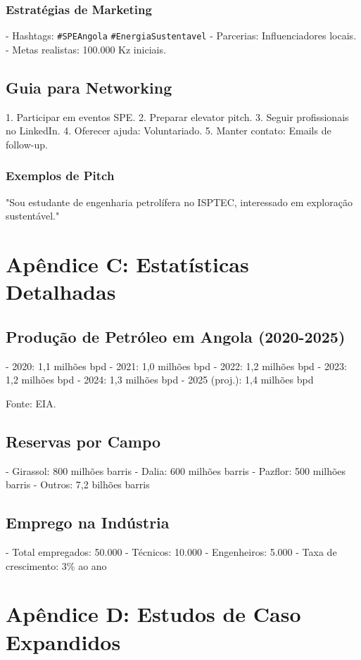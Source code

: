 \documentclass[12pt]{article}
\begin{document}
\subsubsection{Estratégias de Marketing}
- Hashtags: \verb|#SPEAngola| \verb|#EnergiaSustentavel|
- Parcerias: Influenciadores locais.
- Metas realistas: 100.000 Kz iniciais.

\subsection{Guia para Networking}
1. Participar em eventos SPE.
2. Preparar elevator pitch.
3. Seguir profissionais no LinkedIn.
4. Oferecer ajuda: Voluntariado.
5. Manter contato: Emails de follow-up.

\subsubsection{Exemplos de Pitch}
"Sou estudante de engenharia petrolífera no ISPTEC, interessado em exploração sustentável."

\section{Apêndice C: Estatísticas Detalhadas}

\subsection{Produção de Petróleo em Angola (2020-2025)}
- 2020: 1,1 milhões bpd
- 2021: 1,0 milhões bpd
- 2022: 1,2 milhões bpd
- 2023: 1,2 milhões bpd
- 2024: 1,3 milhões bpd
- 2025 (proj.): 1,4 milhões bpd

Fonte: EIA.

\subsection{Reservas por Campo}
- Girassol: 800 milhões barris
- Dalia: 600 milhões barris
- Pazflor: 500 milhões barris
- Outros: 7,2 bilhões barris

\subsection{Emprego na Indústria}
- Total empregados: 50.000
- Técnicos: 10.000
- Engenheiros: 5.000
- Taxa de crescimento: 3\% ao ano

\section{Apêndice D: Estudos de Caso Expandidos}
\end{document}
